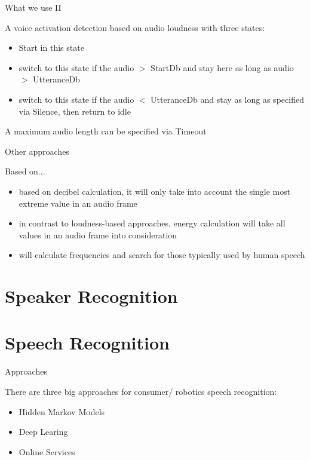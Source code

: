\documentclass{beamer}
\begin{document}
	\begin{frame}{What we use II}
		\begin{alertblock}{A voice activation detection based on audio loudness with three states: }
			\begin{itemize}[leftmargin=*,labelindent=32pt]
				\item[idle] Start in this state
				\item[starting] switch to this state if the audio $>$ StartDb and stay here as long as audio $>$ UtteranceDb
				\item[ending] switch to this state if the audio $<$ UtteranceDb and stay as long as specified via Silence, then return to idle
			\end{itemize}
			A maximum audio length can be specified via Timeout
		\end{alertblock}
	\end{frame}
	
	\begin{frame}{Other approaches}
		\begin{alertblock}{Based on...}
			\begin{itemize}[leftmargin=*,labelindent=32pt]
				\item[loudness] based on decibel calculation, it will only take into account the single most extreme value in an audio frame
				\item[energy] in contrast to loudness-based approaches, energy calculation will take all values in an audio frame into consideration
				\item[frequency] will calculate frequencies and search for those typically used by human speech
			\end{itemize}
		\end{alertblock}
	\end{frame}
	
	\section{Speaker Recognition}%
	
	\section{Speech Recognition}%
	
	\begin{frame}{Approaches}
		\begin{alertblock}{There are three big approaches for consumer/ robotics speech recognition:}
			\begin{itemize}
				\item[-] Hidden Markov Models
				\item[-] Deep Learing
				\item[-] Online Services
			\end{itemize}
		\end{alertblock}
	\end{frame}
	
\end{document}
